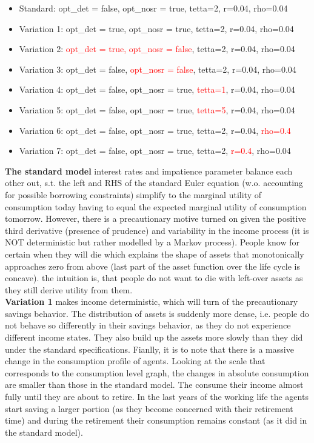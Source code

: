 \documentclass[12pt,a4paper]{article}
\begin{document}
\begin{itemize}
    \item Standard: opt\_det = false, opt\_nosr = true, tetta=2, r=0.04, rho=0.04
    \item Variation 1: opt\_det = true, opt\_nosr = true, tetta=2, r=0.04, rho=0.04
    \item Variation 2: \textcolor{red}{opt\_det = true, opt\_nosr = false}, tetta=2, r=0.04, rho=0.04
    \item Variation 3: opt\_det = false, \textcolor{red}{opt\_nosr = false}, tetta=2, r=0.04, rho=0.04
    \item Variation 4: opt\_det = false, opt\_nosr = true, \textcolor{red}{tetta=1}, r=0.04, rho=0.04
    \item Variation 5: opt\_det = false, opt\_nosr = true, \textcolor{red}{tetta=5}, r=0.04, rho=0.04
    \item Variation 6: opt\_det = false, opt\_nosr = true, tetta=2, r=0.04, \textcolor{red}{rho=0.4} 
    \item Variation 7: opt\_det = false, opt\_nosr = true, tetta=2, \textcolor{red}{r=0.4}, rho=0.04 
\end{itemize}

\textbf{The standard model} interest rates and impatience parameter balance each other out, s.t. the left and RHS of the standard Euler equation (w.o. accounting for possible borrowing constraints) simplify to the marginal utility of consumption today having to equal the expected marginal utility of consumption tomorrow. However, there is a precautionary motive turned on given the positive third derivative (presence of prudence) and variability in the income process (it is NOT deterministic but rather modelled by a Markov process). People know for certain when they will die which explains the shape of assets that monotonically approaches zero from above (last part of the asset function over the life cycle is concave). the intuition is, that people do not want to die with left-over assets as they still derive utility from them. \\

\textbf{Variation 1} makes income deterministic, which will turn of the precautionary savings behavior. The distribution of assets is suddenly more dense, i.e. people do not behave so differently in their savings behavior, as they do not experience different income states. They also build up the assets more slowly than they did under the standard specifications. Fianlly, it is to note that there is a massive change in the consumption profile of agents. Looking at the scale that corresponds to the consumption level graph, the changes in absolute consumption are smaller than those in the standard model. The consume their income almost fully until they are about to retire. In the last years of the working life the agents start saving a larger portion (as they become concerned with their retirement time) and during the retirement their consumption remains constant (as it did in the standard model). \\
\end{document}
